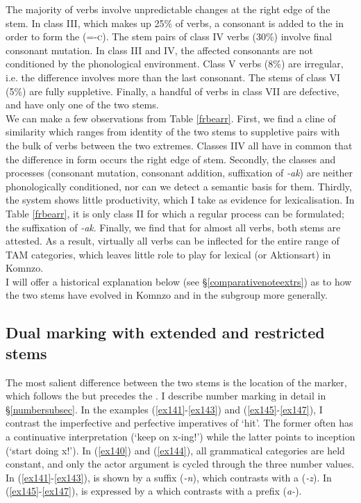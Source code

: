 The majority of verbs involve unpredictable changes at the right edge of the stem. In class III, which makes up 25\% of verbs, a consonant is added to the  in order to form the  (\Rs=\Ext-\textsc{c}). The stem pairs of class IV verbs (30\%) involve final consonant mutation. In class III and IV, the affected consonants are not conditioned by the phonological environment. Class V verbs (8\%) are irregular, i.e. the difference involves more than the last consonant. The stems of class VI (5\%) are fully suppletive. Finally, a handful of verbs in class VII are defective, and have only one of the two stems.\\

We can make a few observations from Table \ref{frbearr}. First, we find a cline of similarity which ranges from identity of the two stems to suppletive pairs with the bulk of verbs between the two extremes. Classes II\textendash{}V all have in common that the difference in form occurs the right edge of stem. Secondly, the classes and processes (consonant mutation, consonant addition, suffixation of \emph{-ak}) are neither phonologically conditioned, nor can we detect a semantic basis for them. Thirdly, the system shows little productivity, which I take as evidence for lexicalisation. In Table \ref{frbearr}, it is only class II for which a regular process can be formulated; the suffixation of \emph{-ak}. Finally, we find that for almost all verbs, both stems are attested. As a result, virtually all verbs can be inflected for the entire range of TAM categories, which leaves little role to play for lexical  (or Aktionsart) in Komnzo.\\

I will offer a historical explanation below (see \S{}\ref{comparativenoteextrs}) as to how the two stems have evolved in Komnzo and in the  subgroup more generally.

\subsection{Dual marking with extended and restricted stems} \label{dualextrs}

The most salient difference between the two stems is the location of the  marker, which follows the  but precedes the . I describe number marking in detail in \S{}\ref{numbersubsec}. In the examples (\ref{ex141}-\ref{ex143}) and (\ref{ex145}-\ref{ex147}), I contrast the imperfective and perfective imperatives of `hit'. The former often has a continuative interpretation (`keep on x-ing!') while the latter points to inception (`start doing x!'). In (\ref{ex140}) and (\ref{ex144}), all grammatical categories are held constant, and only the actor argument is cycled through the three number values. In (\ref{ex141}-\ref{ex143}),  is shown by a suffix (\emph{-n}), which contrasts with a  (\emph{-z}). In (\ref{ex145}-\ref{ex147}),  is expressed by a  which contrasts with a  prefix (\emph{a-}).

